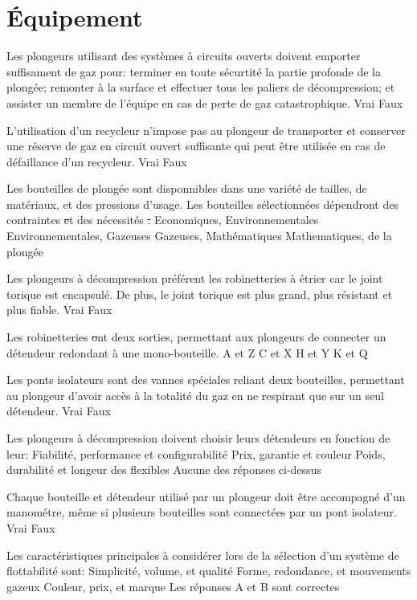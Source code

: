 \documentclass[english,10pt,a4paper,twoside]{article}
\begin{document}
	\section{Équipement}

	\begin{outline}
		\1 Les plongeurs utilisant des systèmes à circuits ouverts doivent emporter suffisament de gaz pour: terminer en toute sécurtité la partie profonde de la plongée; remonter à la surface et effectuer tous les paliers de décompression; et assister un membre de l'équipe en cas de perte de gaz catastrophique.
			\2 Vrai
			\2 Faux

		\1 L'utilisation d'un recycleur n'impose pas au plongeur de transporter et conserver une réserve de gaz en circuit ouvert suffisante qui peut être utilisée en cas de défaillance d'un recycleur.
			\2 Vrai
			\2 Faux

		\1 Les bouteilles de plongée sont disponnibles dans une variété de tailles, de matériaux, et des pressions d'usage. Les bouteilles sélectionnées dépendront des contraintes \st et des nécessités \st.
			\2 Economiques, Environnementales
			\2 Environnementales, Gazeuses
			\2 Gazeuses, Mathématiques
			\2 Mathematiques, de la plongée

		\1 Les plongeurs à décompression préférent les robinetteries à étrier car le joint torique est encapsulé. De plus, le joint torique est plus grand, plus résistant et plus fiable.
			\2 Vrai
			\2 Faux

		\1 Les robinetteries \st ont deux sorties, permettant aux plongeurs de connecter un détendeur redondant à une mono-bouteille.
			\2 A et Z
			\2 C et X
			\2 H et Y
			\2 K et Q 

		\1 Les ponts isolateurs sont des vannes spéciales reliant deux bouteilles, permettant au plongeur d'avoir accès à la totalité du gaz en ne respirant que sur un seul détendeur.
			\2 Vrai
			\2 Faux

		\1 Les plongeurs à décompression doivent choisir leurs détendeurs en fonction de leur:
			\2 Fiabilité, performance et configurabilité
			\2 Prix, garantie et couleur
			\2 Poids, durabilité et longeur des flexibles
			\2 Aucune des réponses ci-dessus

		\1 Chaque bouteille et détendeur utilisé par un plongeur doit être accompagné d'un manométre, même si plusieurs bouteilles sont connectées par un pont isolateur.
			\2 Vrai
			\2 Faux

		\1 Les caractéristiques principales à considérer lors de la sélection d'un système de flottabilité sont:
			\2 Simplicité, volume, et qualité
			\2 Forme, redondance, et mouvements gazeux
			\2 Couleur, prix, et marque
			\2 Les réponses A et B sont correctes


\end{outline}
\end{document}
